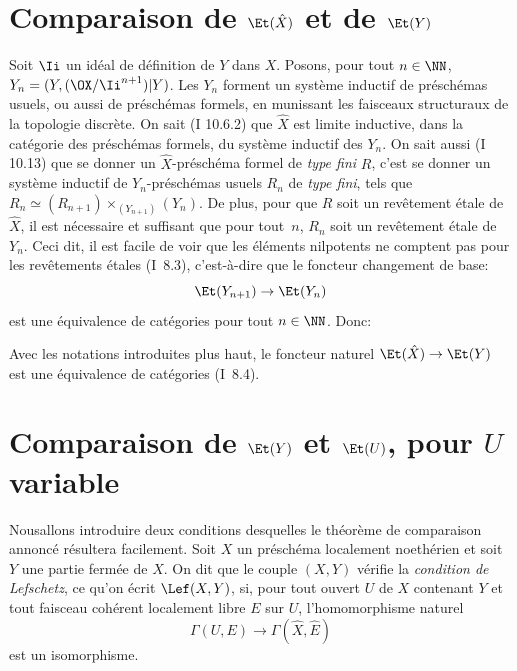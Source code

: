 \enlargethispage{3mm}%
\section{Comparaison de $\Et(\hat{X})$ et de $\Et(Y)$} \label{X.1}

Soit $\Ii$ un id\'eal de d\'efinition de $Y$ dans $X$. Posons, pour tout $n\in\NN$, $Y_n=(Y, (\OX/\Ii^{n+1}){|Y})$. Les $Y_n$ forment un syst\`eme inductif de pr\'esch\'emas usuels, ou aussi de pr\'esch\'emas formels, en munissant les faisceaux structuraux de la topologie discr\`ete. On sait (\EGA I 10.6.2) que $\hat{X}$ est limite inductive, dans la cat\'egorie des pr\'esch\'emas formels, du syst\`eme inductif des $Y_n$. On sait aussi (\EGA I 10.13) que se donner un $\hat{X}$-pr\'esch\'ema formel de \emph{type fini} $R$, c'est se donner un syst\`eme inductif de $Y_n$-pr\'esch\'emas usuels $R_n$ de \emph{type fini}, tels que $R_n\simeq(R_{n+1})\times_{(Y_{n+1})}(Y_n)$. De plus, pour que $R$ soit un rev\^etement \'etale de $\hat{X}$, il est n\'ecessaire et suffisant que pour tout~$n$, $R_n$ soit un rev\^etement \'etale de $Y_n$. Ceci dit, il est facile de voir que les \'el\'ements nilpotents ne comptent pas pour les rev\^etements \'etales (\SGA I~8.3), c'est-\`a-dire que le foncteur changement de base:
\[
\Et(Y_{n+1}) \to \Et(Y_n)
\]
est une \'equivalence de cat\'egories pour tout $n\in\NN$. Donc:

\begin{proposition} \label{X.1.1}
Avec les notations introduites plus haut, le foncteur naturel $\Et(\hat{X})\to\Et(Y)$ est une \'equivalence de cat\'egories (\cf \textup{\SGA I~8.4}).
\end{proposition}

\section{Comparaison de $\Et(Y)$ et $\Et(U)$, pour $U$ variable} \label{X.2}

Nous\pageoriginale allons introduire deux conditions desquelles le th\'eor\`eme de comparaison annonc\'e r\'esultera facilement. Soit $X$ un pr\'esch\'ema localement noeth\'erien et soit $Y$ une partie ferm\'ee de $X$. On dit que le couple $(X, Y)$ v\'erifie la \emph{condition de Lefschetz}, ce qu'on \'ecrit $\Lef(X, Y)$,\label{pX.2} si, pour tout ouvert $U$ de $X$ contenant $Y$ et tout faisceau coh\'erent localement libre $E$ sur $U$, l'homomorphisme naturel
\[
\Gamma(U, E) \to \Gamma(\hat{X}, \hat{E})
\]
est un isomorphisme.

